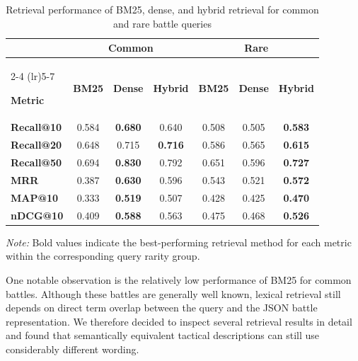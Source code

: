 \begin{table}[htbp]
    \centering
    \caption{Retrieval performance of BM25, dense, and hybrid retrieval for common and rare battle queries}
    \label{tab:retrieval_common_rare}

    \small
    \renewcommand{\arraystretch}{1.4}
    \setlength{\tabcolsep}{5pt}

    \begin{tabular}{l ccc ccc}
        \toprule
        & \multicolumn{3}{c}{\textbf{Common}}
        & \multicolumn{3}{c}{\textbf{Rare}} \\
        \cmidrule(lr){2-4}
        \cmidrule(lr){5-7}

        \textbf{Metric} &
        \textbf{BM25} &
        \textbf{Dense} &
        \textbf{Hybrid} &
        \textbf{BM25} &
        \textbf{Dense} &
        \textbf{Hybrid} \\
        \midrule

        \textbf{Recall@10} &
        0.584 & \textbf{0.680} & 0.640 &
        0.508 & 0.505 & \textbf{0.583} \\

        \textbf{Recall@20} &
        0.648 & 0.715 & \textbf{0.716} &
        0.586 & 0.565 & \textbf{0.615} \\

        \textbf{Recall@50} &
        0.694 & \textbf{0.830} & 0.792 &
        0.651 & 0.596 & \textbf{0.727} \\

        \textbf{MRR} &
        0.387 & \textbf{0.630} & 0.596 &
        0.543 & 0.521 & \textbf{0.572} \\

        \textbf{MAP@10} &
        0.333 & \textbf{0.519} & 0.507 &
        0.428 & 0.425 & \textbf{0.470} \\

        \textbf{nDCG@10} &
        0.409 & \textbf{0.588} & 0.563 &
        0.475 & 0.468 & \textbf{0.526} \\

        \bottomrule
    \end{tabular}

    \par\vspace{4pt}
    \begin{minipage}{\linewidth}
        \footnotesize
        \textit{Note:} Bold values indicate the best-performing
        retrieval method for each metric within the corresponding
        query rarity group.
    \end{minipage}

\end{table}
One notable observation is the relatively low performance of BM25 for common battles. Although these battles are generally well known, lexical retrieval still depends on direct term overlap between the query and the JSON battle representation. We therefore decided to inspect several retrieval results in detail and found that semantically equivalent tactical descriptions can still use considerably different wording.

